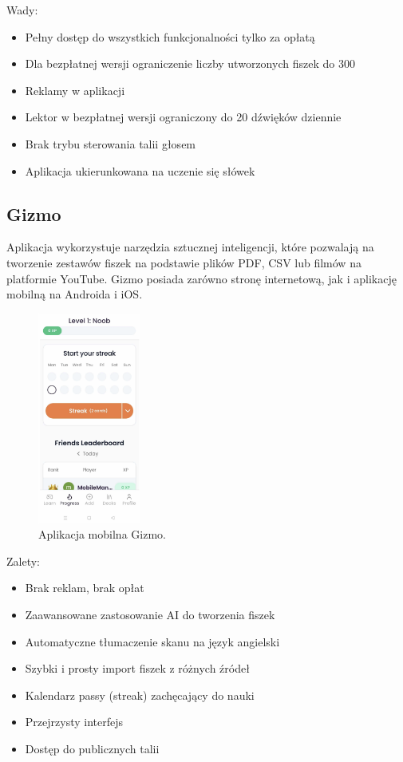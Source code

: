 Wady:
\begin{itemize}
    \item Pełny dostęp do wszystkich funkcjonalności tylko za opłatą
    \item Dla bezpłatnej wersji ograniczenie liczby utworzonych fiszek do 300
    \item Reklamy w aplikacji
    \item Lektor w bezpłatnej wersji ograniczony do 20 dźwięków dziennie
    \item Brak trybu sterowania talii głosem
    \item Aplikacja ukierunkowana na uczenie się słówek
\end{itemize}

\subsection{Gizmo}

Aplikacja wykorzystuje narzędzia sztucznej inteligencji, które pozwalają na tworzenie zestawów fiszek na podstawie plików PDF, CSV lub filmów na platformie YouTube. Gizmo posiada zarówno stronę internetową, jak i aplikację mobilną na Androida i iOS.

\begin{figure}[H]
    \centering
    \includegraphics[width=0.3\textwidth]{chapters/chapter_3/gizmo}
    \caption{Aplikacja mobilna Gizmo.}
    \label{img:gizmo}
\end{figure}

Zalety:
\begin{itemize}
    \item Brak reklam, brak opłat
    \item Zaawansowane zastosowanie AI do tworzenia fiszek
    \item Automatyczne tłumaczenie skanu na język angielski
    \item Szybki i prosty import fiszek z różnych źródeł
    \item Kalendarz passy (streak) zachęcający do nauki
    \item Przejrzysty interfejs
    \item Dostęp do publicznych talii
\end{itemize}

